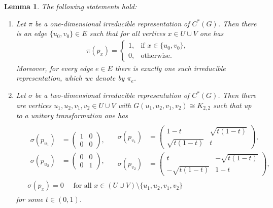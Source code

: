 \documentclass[a4paper]{amsart}
\newtheorem{lemma}[thm]{Lemma}
\begin{document}
\begin{lemma} 
    \label{reps::lemma:representations_vs_edges_and_subgraphs}
    The following statements hold:
    \begin{enumerate}[label=(\alph*)]
        \item Let $\pi$ be a one-dimensional irreducible representation of $C^\ast(G)$. Then there is an edge $\{u_0, v_0\} \in E$ such that for all vertices $x \in U \cup V$ one has
        \begin{align}
            \label{reps::eq:one_dimensional_irreducible_representation_pi_e}
            \pi(p_x) = \begin{cases}
                1, &\text{if } x \in  \{u_0, v_0\}, \\
                0, &\text{otherwise}.
            \end{cases}
        \end{align}
        Moreover, for every edge $e \in E$ there is exactly one such irreducible representation, which we denote by $\pi_e$.

        \item Let $\sigma$ be a two-dimensional irreducible representation of $C^\ast(G)$. Then there are vertices $u_1, u_2, v_1, v_2 \in U \cup V$ with $G(u_1, u_2, v_1, v_2) \cong K_{2, 2}$ such that up to a unitary transformation one has
        \begin{align} 
            \label{reps::eq:two_dimensional_irreducible_representation_sigma}
            \begin{aligned}
            &\begin{aligned}
                \sigma(p_{u_1}) &= \begin{pmatrix}
                1 & 0 \\ 0 & 0
                \end{pmatrix}, \\
                \sigma(p_{u_2}) &= \begin{pmatrix}
                0 & 0 \\ 0 & 1
                \end{pmatrix},
            \end{aligned}
            \quad \begin{aligned}
                \sigma(p_{v_1}) &= \begin{pmatrix}
                1-t & \sqrt{t(1-t)} \\ \sqrt{t(1-t)} & t
                \end{pmatrix}, \\
                \sigma(p_{v_2}) &= \begin{pmatrix}
                t & -\sqrt{t(1-t)} \\ -\sqrt{t(1-t)} & 1-t
                \end{pmatrix},
            \end{aligned}  \\
            & \sigma(p_x) = 0 \quad \text{ for all } x \in (U \cup V) \setminus \{u_1, u_2, v_1, v_2\}
            \end{aligned}
        \end{align}
        for some $t \in (0,1)$.
        

\end{enumerate}
\end{lemma}
\end{document}
